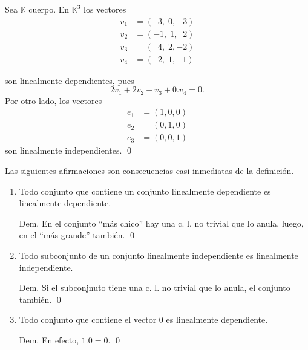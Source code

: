 \documentclass[handout]{beamer} %
\newcommand{\K}{\mathbb K}
\begin{document}
\begin{frame}
    
\begin{ejemplo} Sea $\K$  cuerpo. En $\K^3$ los vectores
\begin{align*}
v_1 &= (\;\;3,\;0,-3) \\
v_2 &= (-1,\;1,\;\;2) \\
v_3 &= (\;\;4,\;2,-2) \\
v_4 &= (\;\;2,\;1,\,\;\;1)
\end{align*}

son linealmente dependientes, pues
$$
2v_1+2v_2 -v_3 +0.v_4 =0.
$$
Por otro lado, los vectores
\begin{align*}
e_1 &= (1,0,0) \\
e_2 &= (0,1,0) \\
e_3 &= (0,0,1) 
\end{align*}
son linealmente independientes. \qed
\end{ejemplo}

\end{frame}  


\begin{frame}
    Las siguientes afirmaciones son consecuencias casi inmediatas de la definición.
    \begin{enumerate}
        \item Todo conjunto que contiene un conjunto linealmente dependiente es linealmente dependiente.
        
        {\color{blue} Dem.} En el conjunto ``más chico''  hay una c. l.  no trivial que lo anula,  luego,  en el ``más grande'' también. \qed
        \item  Todo subconjunto de un conjunto linealmente independiente es linealmente independiente.
        
        {\color{blue} Dem.} Si el subconjnuto tiene una c. l.  no trivial que lo anula,  el conjunto también. \qed
        \item  Todo conjunto que contiene el vector $0$ es linealmente dependiente.
        
        {\color{blue} Dem.} En efecto, $1.0 = 0$. \qed
    \end{enumerate}
\end{frame}  


\begin{frame}
    
\end{frame}  
\end{document}
